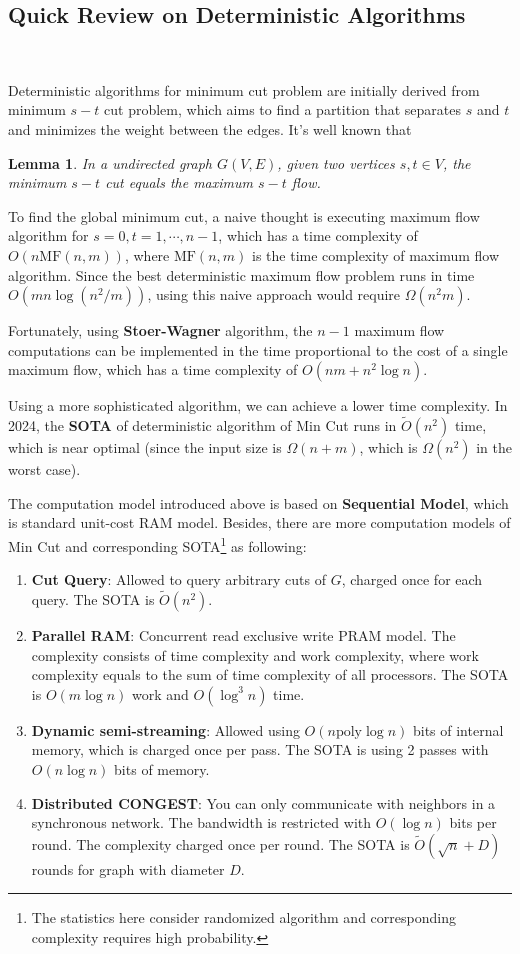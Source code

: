 \documentclass[11pt]{article}
\theoremstyle{plain}
\newtheorem{lemma}{Lemma}[section]
\begin{document}
\subsection{Quick Review on Deterministic Algorithms}\

Deterministic algorithms for minimum cut problem are initially derived from minimum $s-t$ cut problem, which aims to find a partition that separates $s$ and $t$ and minimizes the weight between the edges. It's well known that 
\begin{lemma}
    In a undirected graph $G(V,E)$, given two vertices $s,t\in V$, the minimum $s-t$ cut equals the maximum $s-t$ flow.
\end{lemma}
To find the global minimum cut, a naive thought is executing maximum flow algorithm for $s=0,t=1,\cdots,n-1$, which has a time complexity of $O(n\text{MF}(n,m))$, where $\text{MF}(n,m)$ is the time complexity of maximum flow algorithm. Since the best deterministic maximum flow problem runs in time $O(mn\log(n^2/m))$, using this naive approach would require $\Omega(n^2m)$. 

Fortunately, using \textbf{Stoer-Wagner}\cite{stoer1997simple} algorithm, the $n-1$ maximum flow computations can be implemented in the time proportional to the cost of a single maximum flow, which has a time complexity of $O(nm+n^2\log n)$. 

Using a more sophisticated algorithm, we can achieve a lower time complexity. In 2024, the \textbf{SOTA}\cite{doi:10.1137/1.9781611977912.111} of deterministic algorithm of Min Cut runs in $\tilde{O}(n^2)$ time, which is near optimal (since the input size is $\Omega(n+m)$, which is $\Omega(n^2)$ in the worst case).

The computation model introduced above is based on \textbf{Sequential Model}, which is standard unit-cost RAM model. Besides, there are more computation models of Min Cut and corresponding SOTA\footnote{The statistics here consider randomized algorithm and corresponding complexity requires high probability.} as following:
\begin{enumerate}
    \item \textbf{Cut Query}: Allowed to query arbitrary cuts of $G$, charged once for each query. The SOTA is $\tilde{O}(n^2)$\cite{mukhopadhyay2020weighted}.
    \item \textbf{Parallel RAM}: Concurrent read exclusive write PRAM model. The complexity consists of time complexity and work complexity, where work complexity equals to the sum of time complexity of all processors. The SOTA is $O(m\log n)$ work and $O(\log^3 n)$ time\cite{anderson2023parallel}.
    \item \textbf{Dynamic semi-streaming}: Allowed using $O(n\text{poly}\log n)$ bits of internal memory, which is charged once per pass. The SOTA is using 2 passes with $O(n\log n)$ bits of memory\cite{assadi2021simple}.
    \item \textbf{Distributed CONGEST}: You can only communicate with neighbors in a synchronous network. The bandwidth is restricted with $O(\log n)$ bits per round. The complexity charged once per round. The SOTA is $\tilde{O}(\sqrt{n}+D)$ rounds for graph with diameter $D$\cite{dory2021distributed}.
\end{enumerate}
\end{document}
